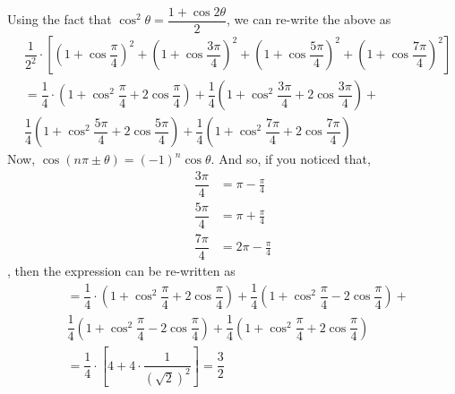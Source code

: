 \begin{solution}[\fullpage]
  \begin{fullwidth}
    Using the fact that $\cos^2\theta = \dfrac{1+\cos 2\theta}{2}$,  we can re-write the above as
    \begin{align}
       &\dfrac{1}{2^2}\cdot\left[\left( 1+\cos\dfrac{\pi}{4}\right)^2 + 
       \left( 1+\cos\dfrac{3\pi}{4}\right)^2
       + \left( 1+\cos\dfrac{5\pi}{4}\right)^2 + 
       \left( 1+\cos\dfrac{7\pi}{4}\right)^2\right] \\
       &= \dfrac{1}{4}\cdot\left( 1 + \cos^2\dfrac{\pi}{4} + 2\cos\dfrac{\pi}{4}\right) +
          \dfrac{1}{4}\left( 1 + \cos^2\dfrac{3\pi}{4} + 2\cos\dfrac{3\pi}{4}\right) + \nonumber \\
       & \dfrac{1}{4}\left( 1 + \cos^2\dfrac{5\pi}{4} + 2\cos\dfrac{5\pi}{4}\right) + 
          \dfrac{1}{4}\left( 1 + \cos^2\dfrac{7\pi}{4} + 2\cos\dfrac{7\pi}{4}\right) 
    \end{align}
    Now, $\cos(n\pi \pm \theta) = (-1)^{n}\cos\theta$. And so, if you noticed that,
    \begin{align}
    	\dfrac{3\pi}{4} &= \pi - \frac{\pi}{4} \\
    	\dfrac{5\pi}{4} &= \pi + \frac{\pi}{4} \\
    	\dfrac{7\pi}{4} &= 2\pi - \frac{\pi}{4}
    \end{align}
    , then the expression can be re-written as 
    \begin{align}
       &= \dfrac{1}{4}\cdot\left( 1 + \cos^2\dfrac{\pi}{4} + 2\cos\dfrac{\pi}{4}\right) +
          \dfrac{1}{4}\left( 1 + \cos^2\dfrac{\pi}{4} - 2\cos\dfrac{\pi}{4}\right) + \nonumber \\
       & \dfrac{1}{4}\left( 1 + \cos^2\dfrac{\pi}{4} - 2\cos\dfrac{\pi}{4}\right) + 
          \dfrac{1}{4}\left( 1 + \cos^2\dfrac{\pi}{4} + 2\cos\dfrac{\pi}{4}\right) \\
       &= \dfrac{1}{4}\cdot\left[ 4 + 4\cdot\dfrac{1}{(\sqrt{2})^2}\right] = \dfrac{3}{2} 
    \end{align}
  \end{fullwidth}
\end{solution}
